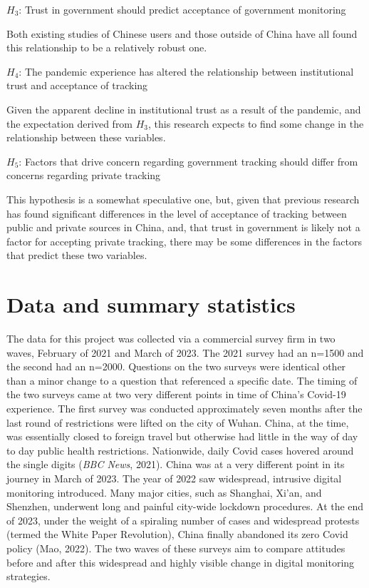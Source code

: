 \documentclass[
  letterpaper,
  DIV=11,
  numbers=noendperiod]{scrartcl}
\begin{document}
\(H_3\): Trust in government should predict acceptance of government
monitoring

Both existing studies of Chinese users and those outside of China have
all found this relationship to be a relatively robust one.

\(H_4\): The pandemic experience has altered the relationship between
institutional trust and acceptance of tracking

Given the apparent decline in institutional trust as a result of the
pandemic, and the expectation derived from \(H_3\), this research
expects to find some change in the relationship between these variables.

\(H_5\): Factors that drive concern regarding government tracking should
differ from concerns regarding private tracking

This hypothesis is a somewhat speculative one, but, given that previous
research has found significant differences in the level of acceptance of
tracking between public and private sources in China, and, that trust in
government is likely not a factor for accepting private tracking, there
may be some differences in the factors that predict these two variables.

\section{Data and summary statistics}\label{sec-datasummary}

The data for this project was collected via a commercial survey firm in
two waves, February of 2021 and March of 2023. The 2021 survey had an
n=1500 and the second had an n=2000. Questions on the two surveys were
identical other than a minor change to a question that referenced a
specific date. The timing of the two surveys came at two very different
points in time of China's Covid-19 experience. The first survey was
conducted approximately seven months after the last round of
restrictions were lifted on the city of Wuhan. China, at the time, was
essentially closed to foreign travel but otherwise had little in the way
of day to day public health restrictions. Nationwide, daily Covid cases
hovered around the single digits (\emph{BBC News}, 2021). China was at a
very different point in its journey in March of 2023. The year of 2022
saw widespread, intrusive digital monitoring introduced. Many major
cities, such as Shanghai, Xi'an, and Shenzhen, underwent long and
painful city-wide lockdown procedures. At the end of 2023, under the
weight of a spiraling number of cases and widespread protests (termed
the White Paper Revolution), China finally abandoned its zero Covid
policy (Mao, 2022). The two waves of these surveys aim to compare
attitudes before and after this widespread and highly visible change in
digital monitoring strategies.
\end{document}
